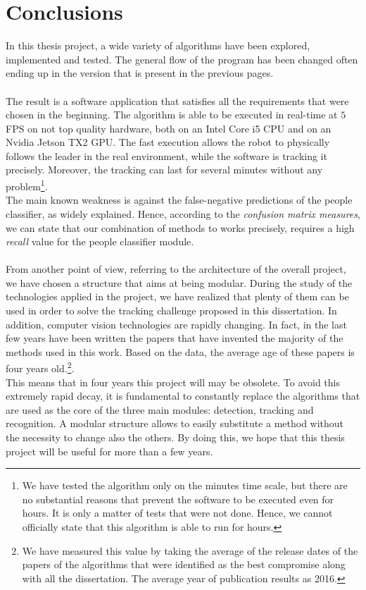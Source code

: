\chapter{Conclusions} \label{cha:conclusions}
In this thesis project, a wide variety of algorithms have been explored, implemented and tested. The general flow of the program has been changed often ending up in the version that is present in the previous pages.\\
\\
The result is a software application that satisfies all the requirements that were chosen in the beginning. The algorithm is able to be executed in real-time at $5$ FPS on not top quality hardware, both on an Intel Core i5 CPU and on an Nvidia Jetson TX2 GPU. The fast execution allows the robot to physically follows the leader in the real environment, while the software is tracking it precisely. Moreover, the tracking can last for several minutes without any problem\footnote{We have tested the algorithm only on the minutes time scale, but there are no substantial reasons that prevent the software to be executed even for hours. It is only a matter of tests that were not done. Hence, we cannot officially state that this algorithm is able to run for hours.}.\\
The main known weakness is against the false-negative predictions of the people classifier, as widely explained. Hence, according to the \textit{confusion matrix measures}, we can state that our combination of methods to works precisely, requires a high \textit{recall} value for the people classifier module.\\
\\
From another point of view, referring to the architecture of the overall project, we have chosen a structure that aims at being modular. During the study of the technologies applied in the project, we have realized that plenty of them can be used in order to solve the tracking challenge proposed in this dissertation. In addition, computer vision technologies are rapidly changing. In fact, in the last few years have been written the papers that have invented the majority of the methods used in this work. Based on the data, the average age of these papers is four years old.\footnote{We have measured this value by taking the average of the release dates of the papers of the algorithms that were identified as the best compromise along with all the dissertation. The average year of publication results as 2016.}.\\
This means that in four years this project will may be obsolete. To avoid this extremely rapid decay, it is fundamental to constantly replace the algorithms that are used as the core of the three main modules: detection, tracking and recognition. A modular structure allows to easily substitute a method without the necessity to change also the others. By doing this, we hope that this thesis project will be useful for more than a few years.


